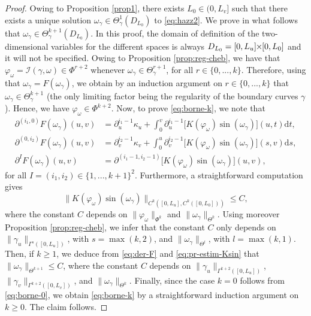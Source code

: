 \documentclass{article}
\newcommand{\I}{\mathcal{I}}
\newcommand{\PLH}{{\mkern-1mu\times\mkern-1mu}}
\newcommand{\Times}{\PLH}
\newcommand{\ko}{\kappa}
\newcommand{\ds}{\mathrm{d}s}
\newcommand{\dt}{\mathrm{d}t}
\theoremstyle{remark}
\theoremstyle{prpart}
\begin{document}
\begin{proof}
Owing to Proposition \ref{prop1}, there exists $L_0\in(0,L_v]$ such that there exists a unique solution  $\omega_\gamma \in \Theta^1_{\gamma}(D_{L_0})$ to \eqref{eq:hazz2}. We prove in what follows that $\omega_\gamma \in \Theta^{k+1}_{\gamma}(D_{L_0})$.
In this proof, the domain of definition of the two-dimensional variables for the different spaces is always $D_{L_0}=[0,L_u]\Times[0,L_0]$ and it will not be specified. 
Owing to Proposition \ref{prop:reg-cheb}, we have that $\varphi_\omega = \I(\gamma,\omega)\in \Phi^{r+2}$ whenever $\omega_\gamma\in \Theta^{r+1}_\gamma$, for all $r\in\{0,...,k\}$. Therefore, using that $\omega_\gamma=F(\omega_\gamma)$, we obtain by an induction argument on $r\in\{0,...,k\}$ that $\omega_\gamma\in \Theta^{k+1}_\gamma$ (the only limiting factor being the regularity of the boundary curves $\gamma$). Hence, we have $\varphi_\omega\in\Phi^{k+2}$. Now, to prove \eqref{eq:borne-k}, we note that 
\begin{subequations}\label{eq:der-F}
\begin{align}
\partial^{(i_1,0)}F(\omega_\gamma)(u,v) &= \partial_u^{i_1-1}\ko_u+\int_0^v\partial_u^{i_1-1}\big[K(\varphi_\omega)\sin(\omega_\gamma)\big](u,t)\dt,\label{eq:der-Fa}\\
\partial^{(0,i_2)}F(\omega_\gamma)(u,v) &= \partial_v^{i_2-1}\ko_v+\int_0^u\partial_v^{i_2-1}\big[K(\varphi_\omega)\sin(\omega_\gamma)\big](s,v)\ds,\label{eq:der-Fb}\\
\partial^IF(\omega_\gamma)(u,v) &= \partial^{(i_1-1,i_2-1)}\big[K(\varphi_\omega)\sin(\omega_\gamma)\big](u,v),\label{eq:der-Fc}
\end{align}
\end{subequations}
for all $I=(i_1,i_2)\in\{1,...,k{+}1\}^2$. Furthermore, a straightforward computation gives
\begin{equation}\label{eq:pr-estim-Ksin}
\|K(\varphi_\omega)\sin(\omega_\gamma)\|_{C^k([0,L_u],C^k([0,L_0]))}\leq C,
\end{equation}
where the constant $C$ depends on $\|\varphi_\omega\|_{\Phi^k}$ and $\|\omega_\gamma\|_{\Theta^k}$. Using moreover Proposition \ref{prop:reg-cheb}, we infer that the constant $C$ only depends on $\|\gamma_u\|_{\Gamma^s([0,L_u])}$, with $s=\max(k,2)$, and $\|\omega_\gamma\|_{\Theta^{l}}$, with $l=\max(k,1)$. Then, if $k\geq1$, we deduce from \eqref{eq:der-F} and \eqref{eq:pr-estim-Ksin} that $\|\omega_\gamma\|_{\Theta^{k+1}} \leq C$, where the constant $C$ depends on $\|\gamma_u\|_{\Gamma^{k+2}([0,L_u])}$, $\|\gamma_v\|_{\Gamma^{k+2}([0,L_v])}$, and $\|\omega_\gamma\|_{\Theta^{k}}$.
Finally, since the case $k=0$ follows from \eqref{eq:borne-0}, we obtain \eqref{eq:borne-k} by a straightforward induction argument on $k\geq0$. The claim follows.
\end{proof}
\end{document}
